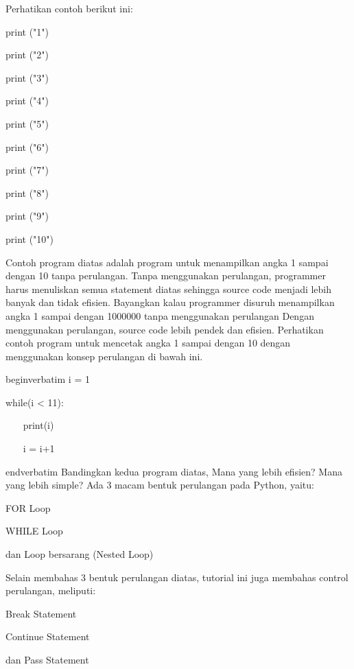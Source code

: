 \vspace{12pt}
Perhatikan contoh berikut ini:\vspace{\baselineskip}
\vspace{\baselineskip}
 \par
\vspace{12pt}
print ("1") \par
print ("2") \par
print ("3") \par
print ("4") \par
print ("5") \par
print ("6") \par
print ("7") \par
print ("8") \par
print ("9") \par
print ("10") \par
\vspace{12pt}
\vspace{\baselineskip}
Contoh program diatas adalah program untuk menampilkan angka 1 sampai dengan 10 tanpa perulangan. Tanpa menggunakan perulangan, programmer harus menuliskan semua statement diatas sehingga source code menjadi lebih banyak dan tidak efisien. Bayangkan kalau programmer disuruh menampilkan angka 1 sampai dengan 1000000 tanpa menggunakan perulangan\vspace{\baselineskip}
\vspace{\baselineskip}
Dengan menggunakan perulangan, source code lebih pendek dan efisien. Perhatikan contoh program untuk mencetak angka 1 sampai dengan 10 dengan menggunakan konsep perulangan di bawah ini.\vspace{\baselineskip}
\vspace{\baselineskip}
 \par
\vspace{12pt}
begin{verbatim}
i = 1 \par
while(i < 11): \par
~~~ print(i) \par
~~~ i = i+1 \par
end{verbatim}
\vspace{\baselineskip}
Bandingkan kedua program diatas, Mana yang lebih efisien? Mana yang lebih simple?\vspace{\baselineskip}
\vspace{\baselineskip}
Ada 3 macam bentuk perulangan pada Python, yaitu: \par
FOR Loop \par
WHILE Loop \par
dan Loop bersarang (Nested Loop) \par
\vspace{\baselineskip}
Selain membahas 3 bentuk perulangan diatas, tutorial ini juga membahas control perulangan, meliputi: \par
Break Statement \par
Continue Statement \par
dan Pass Statement \par
\vspace{\baselineskip}
\vspace{12pt}

